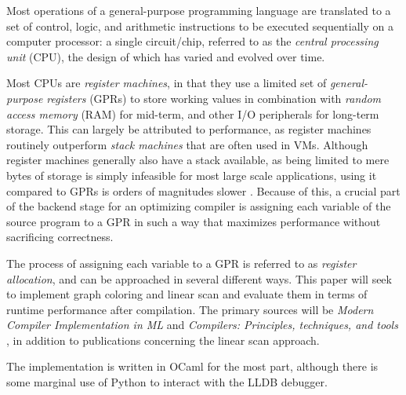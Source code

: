\documentclass{article}
\begin{document}
\noindent Most operations of a general-purpose programming language are translated to a set of control, logic, and arithmetic instructions to be executed sequentially on a computer processor: a single circuit/chip, referred to as the \textit{central processing unit} (CPU), the design of which has varied and evolved over time.

Most CPUs are \textit{register machines}, in that they use a limited set of \textit{general-purpose registers} (GPRs) to store working values in combination with \textit{random access memory} (RAM) for mid-term, and other I/O peripherals for long-term storage. This can largely be attributed to performance, as register machines routinely outperform \textit{stack machines} \parencite{ShiYunhe2008VmsS} that are often used in VMs.
Although register machines generally also have a stack available, as being limited to mere bytes of storage is simply infeasible for most large scale applications, using it compared to GPRs is orders of magnitudes slower \cite{latency}. %
Because of this, a crucial part of the backend stage for an optimizing compiler is assigning each variable  of the source program to a GPR in such a way that maximizes performance without sacrificing correctness.



The process of assigning each variable to a GPR is referred to as \textit{register allocation}, and can be approached in several different ways. This paper will seek to implement graph coloring and linear scan and evaluate them in terms of runtime performance after compilation. %
The primary sources will be \textit{Modern Compiler Implementation in ML} \parencite{tiger} and \textit{Compilers: Principles, techniques, and tools} \parencite{dragon}, in addition to publications concerning the linear scan approach.

The implementation is written in OCaml for the most part, although there is some marginal use of Python to interact with the LLDB debugger.




\end{document}
